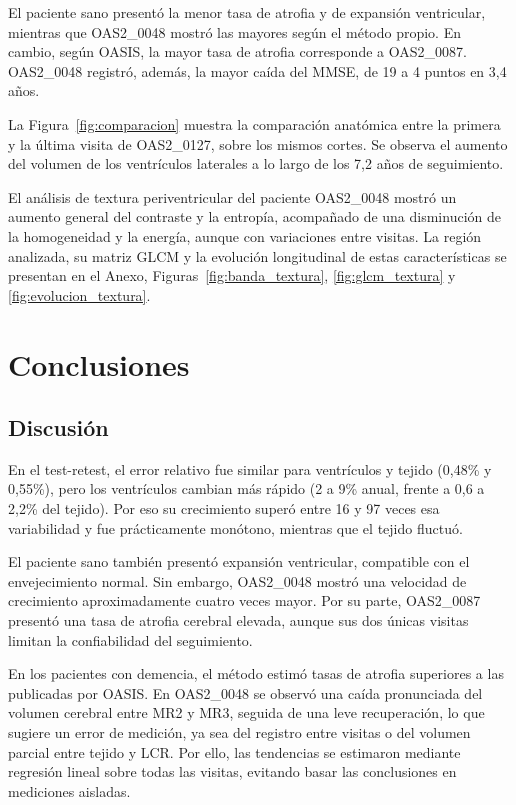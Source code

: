 \documentclass[10pt]{article}
\begin{document}
El paciente sano presentó la menor tasa de atrofia y de expansión ventricular, mientras que OAS2\_0048 mostró las mayores según el método propio. En cambio, según OASIS, la mayor tasa de atrofia corresponde a OAS2\_0087. OAS2\_0048 registró, además, la mayor caída del MMSE, de 19 a 4 puntos en 3,4 años.

La Figura~\ref{fig:comparacion} muestra la comparación anatómica entre la primera y la última visita de OAS2\_0127, sobre los mismos cortes. Se observa el aumento del volumen de los ventrículos laterales a lo largo de los 7,2 años de seguimiento.
 


El análisis de textura periventricular del paciente OAS2\_0048 mostró un aumento general del contraste y la entropía, acompañado de una disminución de la homogeneidad y la energía, aunque con variaciones entre visitas. La región analizada, su matriz GLCM y la evolución longitudinal de estas características se presentan en el Anexo, Figuras~\ref{fig:banda_textura}, \ref{fig:glcm_textura} y \ref{fig:evolucion_textura}.

\section{Conclusiones}

\subsection{Discusión}

En el test-retest, el error relativo fue similar para ventrículos y tejido (0,48\% y 0,55\%), pero los ventrículos cambian más rápido (2 a 9\% anual, frente a 0,6 a 2,2\% del tejido). Por eso su crecimiento superó entre 16 y 97 veces esa variabilidad y fue prácticamente monótono, mientras que el tejido fluctuó.

El paciente sano también presentó expansión ventricular, compatible con el envejecimiento normal. Sin embargo, OAS2\_0048 mostró una velocidad de crecimiento aproximadamente cuatro veces mayor. Por su parte, OAS2\_0087 presentó una tasa de atrofia cerebral elevada, aunque sus dos únicas visitas limitan la confiabilidad del seguimiento.

En los pacientes con demencia, el método estimó tasas de atrofia superiores a las publicadas por OASIS. En OAS2\_0048 se observó una caída pronunciada del volumen cerebral entre MR2 y MR3, seguida de una leve recuperación, lo que sugiere un error de medición, ya sea del registro entre visitas o del volumen parcial entre tejido y LCR. Por ello, las tendencias se estimaron mediante regresión lineal sobre todas las visitas, evitando basar las conclusiones en mediciones aisladas.
\end{document}
